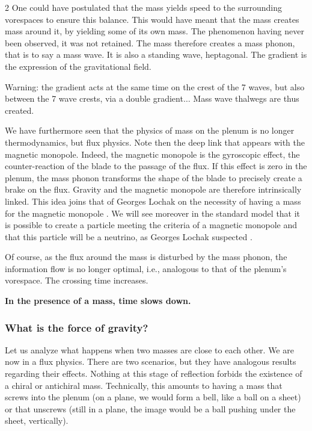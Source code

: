 \begin{multicols}{2}
	One could have postulated that the mass yields speed to the surrounding 
	vorespaces to ensure this balance. This would have meant that the mass 
	creates mass around it, by yielding some of its own mass. The 
	phenomenon having never been observed, it was not retained. The mass 
	therefore creates a mass phonon, that is to say a mass wave. It is also a 
	standing wave, heptagonal. The gradient is the expression of the 
	gravitational field.
	
	Warning: the gradient acts at the same time on the crest of the 7 waves, 
	but also between the 7 wave crests, via a double gradient$\dots$ Mass 
	wave thalwegs are thus created.
	
	We have furthermore seen that the physics of mass on the plenum is no 
	longer thermodynamics, but flux physics. Note then the deep link that 
	appears with the magnetic monopole. Indeed, the magnetic monopole is the 
	gyroscopic effect, the counter-reaction of the blade to the passage of 
	the flux. If this effect is zero in the plenum, the mass phonon 
	transforms the shape of the blade to precisely create a brake on the 
	flux. Gravity and the magnetic monopole are therefore intrinsically 
	linked. This idea joins that of Georges Lochak on the necessity of 
	having a mass for the magnetic monopole \cite{lochak2002monopole}. We will see 
	moreover in the standard model that it is possible to create a particle 
	meeting the criteria of a magnetic monopole and that this particle will 
	be a neutrino, as Georges Lochak suspected \cite{lochak2002monopole}.
	
	Of course, as the flux around the mass is disturbed by the mass phonon, 
	the information flow is no longer optimal, i.e., analogous to that of 
	the plenum's vorespace. The crossing time increases.
	\medskip
	
	\textbf{In the presence of a mass, time slows down.}
	
	\subsubsection*{What is the force of gravity?}
	
	Let us analyze what happens when two masses are close to each other. We 
	are now in a flux physics. There are two scenarios, but they have 
	analogous results regarding their effects. Nothing at this stage of 
	reflection forbids the existence of a chiral or antichiral mass. 
	Technically, this amounts to having a mass that screws into the plenum 
	(on a plane, we would form a bell, like a ball on a sheet) or that 
	unscrews (still in a plane, the image would be a ball pushing under the 
	sheet, vertically).
	

\end{multicols}
